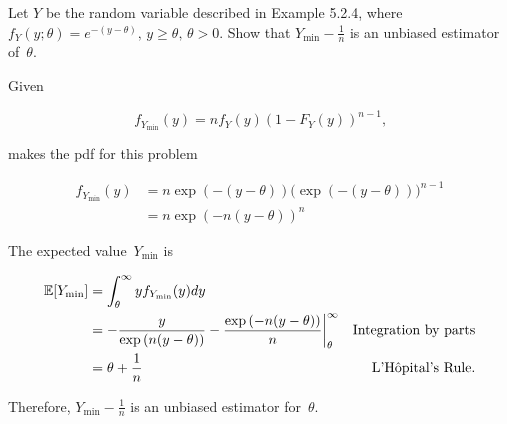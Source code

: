 \begin{problem}
   Let $Y$ be the random variable described in Example 5.2.4, where ${f_{Y} (y; \theta) = e^{-(y-\theta)}\text{, }y \geq \theta\text{, }\theta > 0}$. Show that ${Y_{\min} - \frac{1}{n}}$ is an unbiased estimator of~$\theta$.
\end{problem}

Given

\begin{equation}
  f_{Y_{\min}}(y) = n f_{Y}(y) (1 - F_{Y}(y))^{n-1}\text{,}
\end{equation}

\noindent
makes the pdf for this problem

\begin{align}
  f_{Y_{\min}}(y) &= n\exp\left(-(y-\theta)\right) \bigg(\exp\left(-(y-\theta)\right)\bigg)^{n-1} \\
                  &= n \exp\left(-n(y-\theta)\right)^{n}
\end{align}

The expected value~$Y_{\min}$ is

\begin{align}
  \mathbb{E}\lbrack Y_{\min}\rbrack &= \int_{\theta}^{\infty} y f_{Y_{\min}}(y) dy \\
                    &= -\frac{y}{\exp\left(n(y-\theta)\right)} - \frac{\exp\left(-n(y-\theta)\right)}{n} \bigg\vert_{\theta}^{\infty} & \text{Integration by parts} \\
                    &= \theta + \frac{1}{n} & \text{L'H\^{o}pital's Rule} \text{.}
\end{align}

\noindent
Therefore, $\boxed{Y_{\min} - \frac{1}{n}}$ is an unbiased estimator for~$\theta$.
